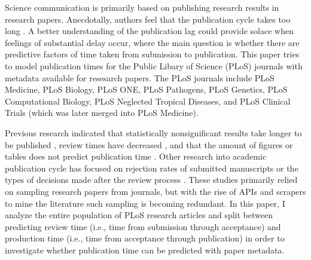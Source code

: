 Science communication is primarily based on publishing research results in research papers. Anecdotally, authors feel that the publication cycle takes too long \cite{Himmelstein2015-me}. A better understanding of the publication lag could provide solace when feelings of substantial delay occur, where the main question is whether there are predictive factors of time taken from submission to publication. This paper tries to model publication times for the Public Libary of Science (PLoS) journals with metadata available for resesarch papers. The PLoS journals include PLoS Medicine, PLoS Biology, PLoS ONE, PLoS Pathogens, PLoS Genetics, PLoS Computational Biology, PLoS Neglected Tropical Diseases, and PLoS Clinical Trials (which was later merged into PLoS Medicine).

Previous research indicated that statistically nonsignificant results take longer to be published \cite{ioannidis1998}, review times have decreased \cite{lyman2013}, and that the amount of figures or tables does not predict publication time \cite{lee2013}. Other research into academic publication cycle has focused on rejection rates of submitted manuscripts or the types of decisions made after the review process \cite{Rosenkrantz2015-uj}. These studies primarily relied on sampling research papers from journals, but with the rise of APIs and scrapers to mine the literature \cite[e.g.,][]{Smith-Unna2014-cd} such sampling is becoming redundant. In this paper, I analyze the entire population of PLoS research articles and split between predicting review time (i.e., time from submission through acceptance) and production time (i.e., time from acceptance through publication) in order to investigate whether publication time can be predicted with paper metadata. 
  
  
  